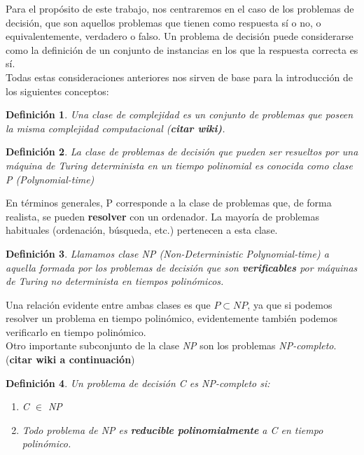 \documentclass[a4paper, 12pt, oneside]{book}
\newtheorem{definicion}{Definici\'on}[chapter]
\begin{document}
	Para el prop\'osito de este trabajo, nos centraremos en el caso de los problemas de decisi\'on, que son aquellos problemas que tienen como respuesta s\'i o no, o equivalentemente, verdadero o falso. Un problema de decisi\'on puede considerarse como la definici\'on de un conjunto de instancias en los que la respuesta correcta es s\'i.
	\\
	
	Todas estas consideraciones anteriores nos sirven de base para la introducci\'on de los siguientes conceptos:
	
	\begin{definicion}
		Una clase de complejidad es un conjunto de problemas que poseen la misma complejidad computacional (\textbf{citar wiki)}.
	\end{definicion}
	
	\begin{definicion}
		La clase de problemas de decisi\'on que pueden ser resueltos por una m\'aquina de Turing determinista en un tiempo polinomial es conocida como clase P (Poly\-nomial-time)
	\end{definicion}
	
	En t\'erminos generales, P corresponde a la clase de problemas que, de forma realista, se pueden \textbf{resolver} con un ordenador. La mayor\'ia de problemas habituales (ordenaci\'on, b\'usqueda, etc.) pertenecen a esta clase.
	
	\begin{definicion}
		Llamamos clase NP (Non-Deterministic Polynomial-time) a aquella formada por los problemas de decisi\'on que son \textbf{verificables} por m\'aquinas de Turing no determinista en tiempos polin\'omicos.
	\end{definicion}
	
	Una relaci\'on evidente entre ambas clases es que $P \subset NP$, ya que si podemos resolver un problema en tiempo polin\'omico, evidentemente tambi\'en podemos verificarlo en tiempo polin\'omico.
	\\
	
	Otro importante subconjunto de la clase \textit{NP} son los problemas \textit{NP-completo}.(\textbf{citar wiki a continuaci\'on})
	
	\begin{definicion}
		Un problema de decisi\'on C es NP-completo si:
		\begin{enumerate}
			\item C $\in$ NP
			\item Todo problema de NP es \textbf{reducible polinomialmente} a C en tiempo polin\'omico.
		\end{enumerate}
	\end{definicion}
	
\end{document}
